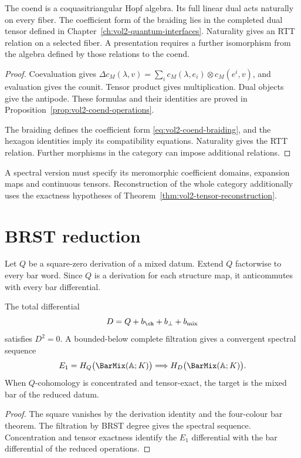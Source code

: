 \begin{theorem}
The coend is a coquasitriangular Hopf algebra.
Its full linear dual acts naturally on every fiber.
The coefficient form of the braiding lies in the completed dual tensor
defined in Chapter~\ref{ch:vol2-quantum-interfaces}.
Naturality gives an RTT relation on a selected fiber.
A presentation requires a further isomorphism from the algebra
defined by those relations to the coend.
\end{theorem}
\begin{proof}
Coevaluation gives
$\Delta c_M(\lambda,v)=\sum_i c_M(\lambda,e_i)\otimes c_M(e^i,v)$,
and evaluation gives the counit.
Tensor product gives multiplication. Dual objects give the antipode.
These formulas and their identities are proved in
Proposition~\ref{prop:vol2-coend-operations}.

The braiding defines the coefficient form
\eqref{eq:vol2-coend-braiding}, and the hexagon identities imply
its compatibility equations. Naturality gives the RTT relation.
Further morphisms in the category can impose additional relations.
\end{proof}

A spectral version must specify its meromorphic coefficient domains,
expansion maps and continuous tensors. Reconstruction of the whole
category additionally uses the exactness hypotheses of
Theorem~\ref{thm:vol2-tensor-reconstruction}.

\chapter{BRST reduction}
Let $Q$ be a square-zero derivation of a mixed datum.  Extend $Q$ factorwise to every bar word.  Since $Q$ is a derivation for each structure map, it anticommutes with every bar differential.

\begin{theorem}
The total differential
\[
 D=Q+b_{\ch}+b_\perp+b_{\mathrm{mix}}
\]
satisfies $D^2=0$.  A bounded-below complete filtration gives a convergent spectral sequence
\[
 E_1=H_Q\bigl(\BarMix(\mathbb A;K)\bigr)
 \Longrightarrow H_D\bigl(\BarMix(\mathbb A;K)\bigr).
\]
When $Q$-cohomology is concentrated and tensor-exact, the target is the mixed bar of the reduced datum.
\end{theorem}
\begin{proof}
The square vanishes by the derivation identity and the four-colour bar theorem.  The filtration by BRST degree gives the spectral sequence.  Concentration and tensor exactness identify the $E_1$ differential with the bar differential of the reduced operations.
\end{proof}

